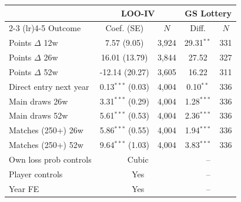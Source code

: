 \begin{tabular}{lcccc}
\toprule
 & \multicolumn{2}{c}{LOO-IV} & \multicolumn{2}{c}{GS Lottery} \\
\cmidrule(lr){2-3} \cmidrule(lr){4-5}
Outcome & Coef. (SE) & $N$ & Diff. & $N$ \\
\midrule
Points $\Delta$ 12w & 7.57 (9.05) & 3,924 & 29.31$^{**}$ & 331 \\
Points $\Delta$ 26w & 16.01 (13.79) & 3,844 & 27.52 & 327 \\
Points $\Delta$ 52w & -12.14 (20.27) & 3,605 & 16.22 & 311 \\
Direct entry next year & 0.13$^{***}$ (0.03) & 4,004 & 0.10$^{**}$ & 336 \\
Main draws 26w & 3.31$^{***}$ (0.29) & 4,004 & 1.28$^{***}$ & 336 \\
Main draws 52w & 5.61$^{***}$ (0.53) & 4,004 & 2.36$^{***}$ & 336 \\
Matches (250+) 26w & 5.86$^{***}$ (0.55) & 4,004 & 1.94$^{***}$ & 336 \\
Matches (250+) 52w & 9.64$^{***}$ (1.03) & 4,004 & 3.83$^{***}$ & 336 \\
\midrule
Own loss prob controls & \multicolumn{2}{c}{Cubic} & \multicolumn{2}{c}{--} \\
Player controls & \multicolumn{2}{c}{Yes} & \multicolumn{2}{c}{--} \\
Year FE & \multicolumn{2}{c}{Yes} & \multicolumn{2}{c}{--} \\
\bottomrule
\end{tabular}
